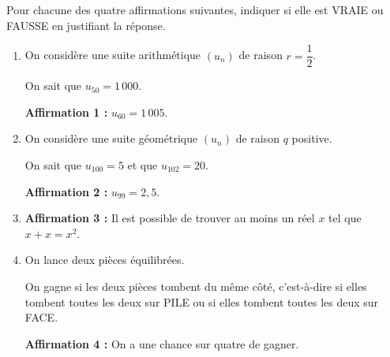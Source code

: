 Pour chacune des quatre affirmations suivantes, indiquer si elle est VRAIE ou FAUSSE en justifiant la réponse.

\begin{enumerate}
\item On considère une suite arithmétique $(u_n)$ de raison $r = \dfrac{1}{2}$.

On sait que $u_{50} = 1\,000$.

\textbf{Affirmation 1 :} $u_{60} = 1\,005$.

\item On considère une suite géométrique $(u_n)$ de raison $q$ positive.

On sait que $u_{100} = 5$ et que $u_{102} = 20$.

\textbf{Affirmation 2 :} $u_{99} = 2,5$.

\item \textbf{Affirmation 3 :} Il est possible de trouver au moins un réel $x$ tel que $x + x = x^2$.

\item On lance deux pièces équilibrées.

On gagne si les deux pièces tombent du même côté, c'est-à-dire si elles tombent toutes les deux sur PILE ou si elles tombent toutes les deux sur FACE.

\textbf{Affirmation 4 :} On a une chance sur quatre de gagner.
\end{enumerate}
